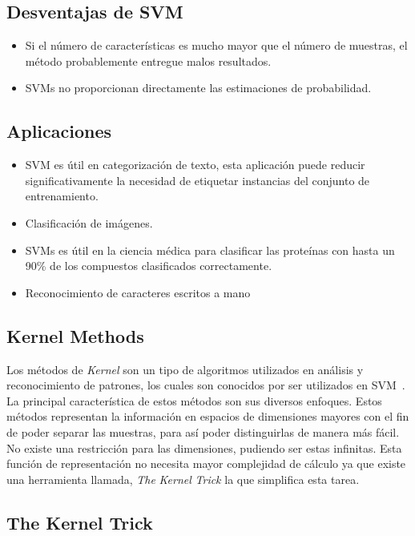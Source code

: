 \subsection{Desventajas de SVM}
\begin{itemize}
\item Si el número de características es mucho mayor que el número de muestras, el método probablemente entregue malos resultados.
\item SVMs no proporcionan directamente las estimaciones de probabilidad.
\end{itemize}

\subsection{Aplicaciones}
\begin{itemize}
\item SVM es útil en categorización de texto, esta aplicación puede reducir significativamente la necesidad de etiquetar instancias del conjunto de entrenamiento.
\item Clasificación de imágenes.
\item SVMs es útil en la ciencia médica para clasificar las proteínas con hasta un 90\% de los compuestos clasificados correctamente.
\item Reconocimiento de caracteres escritos a mano
\end{itemize}

\subsection{Kernel Methods}\label{subsec:kernel_methods}

Los métodos de \textit{Kernel} son un tipo de algoritmos utilizados en análisis y reconocimiento de patrones, los cuales son conocidos por ser utilizados en SVM~\cite{kernels}. La principal característica de estos métodos son sus diversos enfoques. Estos métodos representan la información en espacios de dimensiones mayores con el fin de poder separar las muestras, para así poder distinguirlas de manera más fácil. No existe una restricción para las dimensiones, pudiendo ser estas infinitas. Esta función de representación no necesita mayor complejidad de cálculo ya que existe una herramienta llamada, \textit{The} \textit{Kernel} \textit{Trick} la que simplifica esta tarea.

\subsection{The Kernel Trick}

